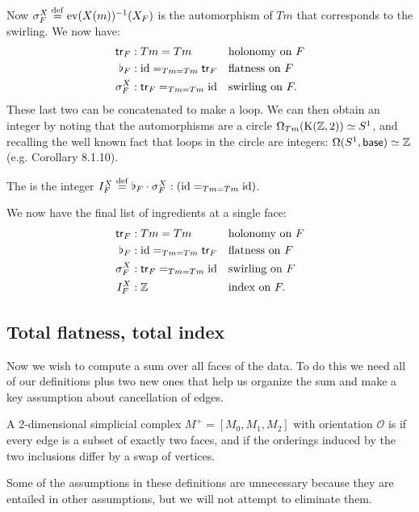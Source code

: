 Now \( \sigma^X_F\stackrel{\mathrm{def}}{=}\mathrm{ev}(X(m))^{-1}(X_F) \) is the automorphism of \( Tm \) that corresponds to the swirling. We now have:
\[\begin{aligned}
\mathsf{tr}_F&:Tm=Tm&&\text{holonomy on }F\\
\flat_F&:\text{id}=_{Tm=Tm}\mathsf{tr}_F&&\text{flatness on }F\\
\sigma^X_F&:\mathsf{tr}_F=_{Tm=Tm}\text{id}&&\text{swirling on }F.\\
\end{aligned}\]
These last two can be concatenated to make a loop. We can then obtain an integer by noting that the automorphisms are a circle \( \Omega_{Tm}(\mathrm{K}(\mathbb{Z},2))\simeq S^1 \), and recalling the well known fact that loops in the circle are integers: \( \Omega(S^1,\mathsf{base})\simeq\mathbb{Z} \) (e.g. \cite{hottbook} Corollary 8.1.10).
\begin{mydef}
\label{def:index}
The  is the integer \( I^X_F\stackrel{\mathrm{def}}{=}\flat_F\cdot \sigma^X_F:(\text{id}=_{Tm=Tm}\text{id}) \).
\end{mydef}
We now have the final list of ingredients at a single face:
\begin{equation}
\label{eq:face_elements}
\begin{aligned}
\mathsf{tr}_F&:Tm=Tm&&\text{holonomy on }F\\
\flat_F&:\text{id}=_{Tm=Tm}\mathsf{tr}_F&&\text{flatness on }F\\
\sigma^X_F&:\mathsf{tr}_F=_{Tm=Tm}\text{id}&&\text{swirling on }F\\
I^X_F&:\mathbb{Z}&&\text{index on }F.
\end{aligned}
\end{equation}

\subsection{Total flatness, total index}
Now we wish to compute a sum over all faces of the data. To do this we need all of our definitions plus two new ones that help us organize the sum and make a key assumption about cancellation of edges.

\begin{mydef}
A 2-dimensional simplicial complex \( M^+=[M_0, M_1, M_2] \) with orientation \( \mathscr{O} \) is  if every edge is a subset of exactly two faces, and if the orderings induced by the two inclusions differ by a swap of vertices.
\end{mydef}

Some of the assumptions in these definitions are unnecessary because they are entailed in other assumptions, but we will not attempt to eliminate them.

